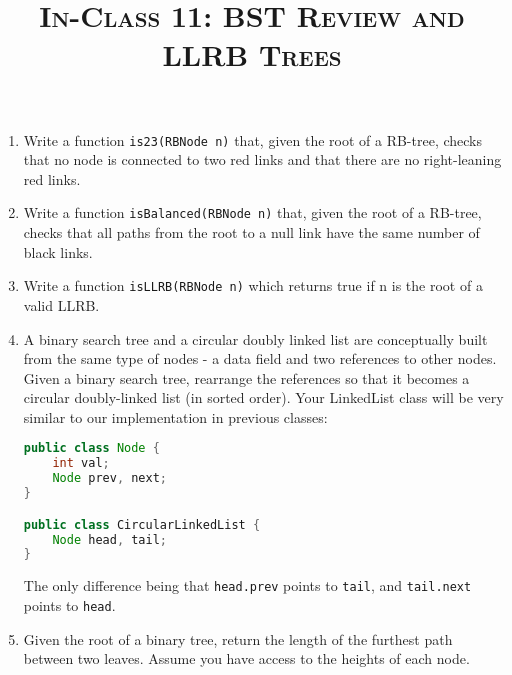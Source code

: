 \documentclass{article}
\title{\large{\textsc{In-Class 11: BST Review and LLRB Trees}}}
\date{}
\begin{document}
\maketitle

\subsection*{}


\begin{enumerate}

\begin{lstlisting}[language=Java]
public class RBNode<T> {
    T key;
    RBNode<T> leftChild, rightChild;
    int height;
    boolean isRed;
}
\end{lstlisting}

\item  Write a function \texttt{is23(RBNode n)} that, given the root of a RB-tree, checks that no node is connected to two red links and that there are no right-leaning red links.

\item  Write a function \texttt{isBalanced(RBNode n)} that, given the root of a RB-tree, checks that all paths from the root to a null link have the same number of black links.

\item Write a function \texttt{isLLRB(RBNode n)} which returns true if n is the root of a valid LLRB.

\item A binary search tree and a circular doubly linked list are conceptually built from the same type of nodes - a data field and two references to other nodes. Given a binary search tree, rearrange the references so that it becomes a circular doubly-linked list (in sorted order). Your LinkedList class will be very similar to our implementation in previous classes:

\begin{lstlisting}[language=Java]
public class Node {
    int val;
    Node prev, next;
}

public class CircularLinkedList {
    Node head, tail;
}

\end{lstlisting}


The only difference being that \texttt{head.prev} points to \texttt{tail}, and \texttt{tail.next} points to \texttt{head}.

\item Given the root of a binary tree, return the length of the furthest path between two leaves. Assume you have access to the heights of each node. 



\end{enumerate}
\end{document}
